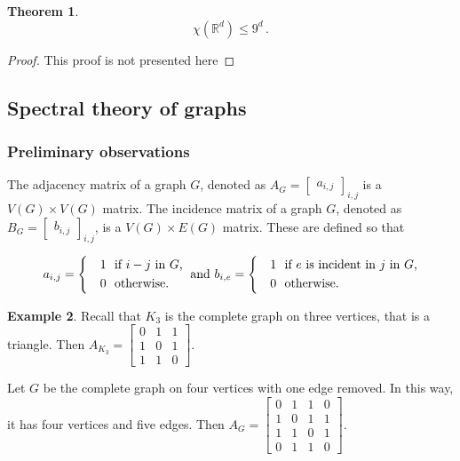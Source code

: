 \documentclass[12pt]{amsart}
\theoremstyle{definition}
\newtheorem{thm}{Theorem}[section]
\newtheorem{smpl}[thm]{Example}
\newcommand{\R}{\mathbb{R}}
\begin{document}
\begin{thm}
$$\chi(\R^d) \leq 9^d \, .$$
\end{thm}

\begin{proof}
This proof is not presented here
\end{proof}

\subsection{Spectral theory of graphs}



\subsubsection*{Preliminary observations}

The adjacency matrix of a graph $G$, denoted as $A_{G} = 
\begin{bmatrix}
a_{i,j}
\end{bmatrix}_{i, j}$ is a $V(G)\times V(G)$ matrix.
The incidence matrix of a graph $G$, denoted as $B_{G} = 
\begin{bmatrix}
b_{i,j}
\end{bmatrix}_{i, j}$, is a $V(G) \times E(G)$ matrix.
These are defined so that

$$ a_{i, j} =\begin{cases*}
      & 1 \text{ if $i \-- j$ in $G$,}\\
      & 0 \text{ otherwise.}
    \end{cases*}  \text{ and }
b_{i, e} =\begin{cases*}
      & 1 \text{ if $e$ is incident in $j$ in $G$,}\\
      & 0 \text{ otherwise.}
    \end{cases*}
    $$

\begin{smpl}
Recall that $K_3$ is the complete graph on three vertices, that is a triangle.
Then $A_{K_3} = 
\begin{bmatrix}
0 & 1 & 1\\
1 & 0 & 1\\
1 & 1 & 0
\end{bmatrix}$.


Let $G$ be the complete graph on four vertices with one edge removed.
In this way, it has four vertices and five edges.
Then $A_{G} = 
\begin{bmatrix}
0 & 1 & 1 & 0\\
1 & 0 & 1 & 1\\
1 & 1 & 0 & 1\\
0 & 1 & 1 & 0
\end{bmatrix}$.


\end{smpl}
\end{document}
